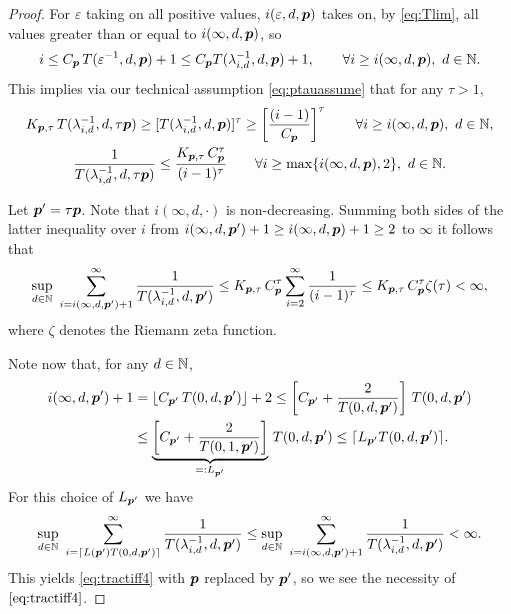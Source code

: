\documentclass[sort&compress]{elsarticle}
\newcommand{\peter}[1]{\begingroup\color{purple}#1\endgroup}
\begin{document}
\begin{proof}
For $\varepsilon$ taking on all positive values, $i(\varepsilon,d,\boldsymbol{p})$ takes on, \peter{by \eqref{eq:Tlim},} all values greater than or equal to $i(\infty,d,\boldsymbol{p})$, so
\[
i\le C_{\boldsymbol{p}}\, T(\varepsilon^{-1},d,\boldsymbol{p})+1 \le C_{\boldsymbol{p}} T(\lambda_{i,d}^{-1},d,\boldsymbol{p})+1, \qquad \forall i \ge i(\infty,d,\boldsymbol{p}),  \ d \in \mathbb{N}.
\]
This implies via our technical assumption \eqref{eq:ptauassume} that for any $\tau > 1$,
\begin{gather*}
	K_{\boldsymbol{p},\tau}\,T (\lambda_{i,d}^{-1},d,\tau \boldsymbol{p}) \ge
	[T(\lambda_{i,d}^{-1},d, \boldsymbol{p})]^\tau
	\ge
	\left[\frac{(i-1)}{C_{\boldsymbol{p}}}\right]^\tau \qquad \forall i \ge i(\infty,d,\boldsymbol{p}),  \ d \in \mathbb{N}, \\
	 \frac{1}{T (\lambda_{i,d}^{-1},d,\tau \boldsymbol{p})} \le
	\frac{K_{\boldsymbol{p},\tau}\, C_{\boldsymbol{p}}^\tau}{(i-1)^\tau}\qquad \forall i \ge \max\{i(\infty,d,\boldsymbol{p}),2\},  \ d \in \mathbb{N}.
\end{gather*}

Let $\boldsymbol{p}' = \tau \boldsymbol{p}$.  Note that $i(\infty,d,\cdot)$ is non-decreasing.  Summing both sides of the latter inequality over $i$ from $i(\infty,d,\boldsymbol{p}') + 1 \ge i(\infty,d, \boldsymbol{p}) + 1 \ge 2$ to $\infty$ it follows that
\begin{equation*}
	\sup_{d\in\mathbb{N}} \, \, \sum_{i=i (\infty,d,\boldsymbol{p}')+1}^\infty \frac{1}{T (\lambda_{i,d}^{-1},d,\boldsymbol{p}')}
	 \le  K_{\boldsymbol{p},\tau}\, C_{\boldsymbol{p}}^\tau
	\sum_{i=2}^\infty \frac{1}{(i-1)^\tau} \\
	 \le  K_{\boldsymbol{p},\tau}\, C_{\boldsymbol{p}}^\tau
	\zeta (\tau)  < \infty,
\end{equation*}
where $\zeta$ denotes the Riemann zeta function.


Note now that, for any $d\in\mathbb{N}$,
\begin{align*}
 i(\infty,d,\boldsymbol{p}') +1  & = \lfloor C_{\boldsymbol{p}'}\, T(0,d,\boldsymbol{p}')\rfloor +2 \le  \left[C_{\boldsymbol{p}'} + \frac{2}{T(0,d,\boldsymbol{p}')}   \right]\, T(0,d,\boldsymbol{p}')\\
 & \le  \underbrace{\left[C_{\boldsymbol{p}'} + \frac{2}{T(0,1,\boldsymbol{p}')}   \right]}_{=:L_{\boldsymbol{p}'}}\, T(0,d,\boldsymbol{p}')
 \le \lceil L_{\boldsymbol{p}'} T(0,d,\boldsymbol{p}')\rceil .
\end{align*}
For this choice of $L_{\boldsymbol{p}'}$ we have
\[
\sup_{d\in\mathbb{N}}\,\, \sum_{i=\lceil L(\boldsymbol{p}') T(0,d,\boldsymbol{p}')\rceil}^\infty \frac{1}{T(\lambda_{i,d}^{-1},d, \boldsymbol{p}')}
\le
\sup_{d\in\mathbb{N}} \, \, \sum_{i=i (\infty,d,\boldsymbol{p}')+1}^\infty \frac{1}{T (\lambda_{i,d}^{-1},d,\boldsymbol{p}')} <
\infty.
\]
This yields \eqref{eq:tractiff4} with $\boldsymbol{p}$ replaced by $\boldsymbol{p}'$, so we see the necessity of $\eqref{eq:tractiff4}$.

\bigskip


\end{proof}
\end{document}
